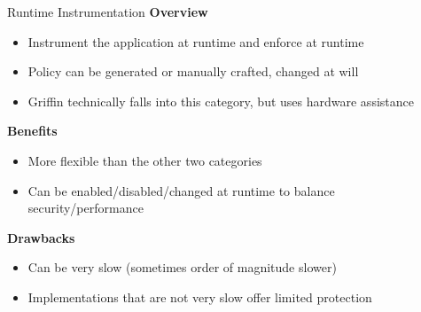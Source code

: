 \documentclass[12pt, dvipsnames, aspectratio=169]{beamer}
\newcommand{\red}[1]{{\color{red}#1}}
\newcommand{\blue}[1]{{\color{blue}#1}}
\begin{document}
\begin{frame}[c]{Runtime Instrumentation}{}
  {\bf Overview}
  \begin{itemize}
    \item Instrument the application at runtime and enforce at runtime
    \item Policy can be generated or manually crafted, changed at will
    \item Griffin technically falls into this category, but uses hardware assistance
  \end{itemize}

  \vfill
  {\bf \blue{Benefits}}
  \begin{itemize}
    \item More flexible than the other two categories
    \item Can be enabled/disabled/changed at runtime to balance security/performance
  \end{itemize}

  \vfill
  {\bf \red{Drawbacks}}
  \begin{itemize}
    \item Can be very slow (sometimes order of magnitude slower)
    \item Implementations that are not very slow offer limited protection
  \end{itemize}
\end{frame}

%
%
\end{document}
